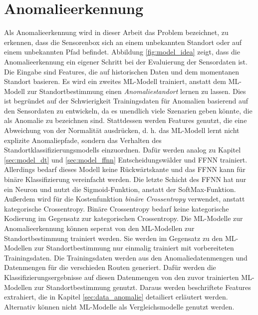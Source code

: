 \newpage
\section{Anomalieerkennung}
Als Anomalieerkennung wird in dieser Arbeit das Problem bezeichnet, zu erkennen, dass die Sensorenbox sich an einem
unbekannten Standort oder auf einem unbekannten Pfad befindet.
Abbildung \ref{fig:model_idea} zeigt, dass die Anomalieerkennung ein eigener Schritt bei der Evaluierung der Sensordaten ist.
Die Eingabe sind Features, die auf historischen Daten und dem momentanen Standort basieren.
\newline
\newline
Es wird ein zweites ML-Modell trainiert, anstatt dem ML-Modell zur Standortbestimmung einen \textit{Anomaliestandort} lernen zu lassen.
Dies ist begründet auf der Schwierigkeit Trainingsdaten für Anomalien basierend auf den Sensordaten zu entwickeln,
da es unendlich viele Szenarien geben könnte, die als Anomalie zu bezeichnen sind.
Stattdessen werden Features genutzt, die eine Abweichung von der Normalität ausdrücken,
d. h. das ML-Modell lernt nicht explizite Anomaliepfade, sondern das Verhalten des Standortklassifizierungsmodells einzuordnen.
\newline
\newline
Dafür werden analog zu Kapitel \ref{sec:model_dt} und \ref{sec:model_ffnn} Entscheidungswälder und FFNN trainiert.
Allerdings bedarf dieses Modell keine Rückwärtskante und das FFNN kann für binäre Klassifizierung vereinfacht werden.
Die letzte Schicht des FFNN hat nur ein Neuron und nutzt die Sigmoid-Funktion, anstatt der SoftMax-Funktion.
Außerdem wird für die Kostenfunktion \textit{binäre Crossentropy} verwendet, anstatt kategorische Crossentropy.
Binäre Crossentropy bedarf keine kategorische Kodierung im Gegensatz zur kategorischen Crossentropy.
\newline
\newline
Die ML-Modelle zur Anomalieerkennung können seperat von den ML-Modellen zur Standortbestimmung trainiert werden.
Sie werden im Gegensatz zu den ML-Modellen zur Standortbestimmung nur einmalig trainiert mit vorbereiteten Trainingsdaten.
Die Trainingsdaten werden aus den Anomaliedatenmengen und Datenmengen für die verschieden Routen generiert.
Dafür werden die Klassifizierungsergebnisse auf diesen Datenmengen von den zuvor trainierten ML-Modellen zur Standortbestimmung genutzt.
Daraus werden beschriftete Features extrahiert, die in Kapitel \ref{sec:data_anomalie} detailiert erläutert werden.
\newpage
Alternativ können nicht ML-Modelle als Vergleichsmodelle genutzt werden.
